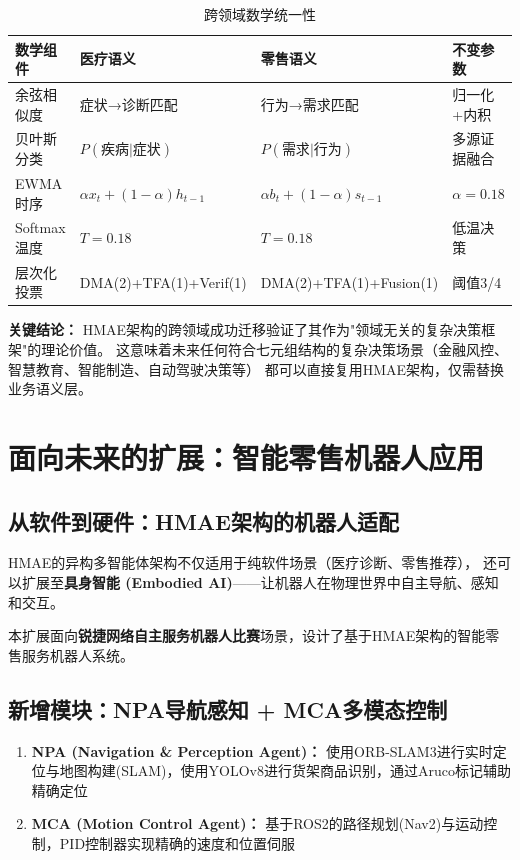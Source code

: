 \documentclass[11pt,a4paper]{ctexart}
\begin{document}
\begin{table}[H]
\centering
\small
\begin{tabular}{p{2.8cm}p{4.2cm}p{4.2cm}p{2.5cm}}
\toprule
\textbf{数学组件} & \textbf{医疗语义} & \textbf{零售语义} & \textbf{不变参数} \\
\midrule
余弦相似度 & 症状→诊断匹配 & 行为→需求匹配 & 归一化+内积 \\
贝叶斯分类 & $P(\text{疾病}|\text{症状})$ & $P(\text{需求}|\text{行为})$ & 多源证据融合 \\
EWMA时序 & $\alpha x_t + (1-\alpha)h_{t-1}$ & $\alpha b_t + (1-\alpha)s_{t-1}$ & $\alpha=0.18$ \\
Softmax温度 & $T=0.18$ & $T=0.18$ & 低温决策 \\
层次化投票 & DMA(2)+TFA(1)+Verif(1) & DMA(2)+TFA(1)+Fusion(1) & 阈值3/4 \\
\bottomrule
\end{tabular}
\caption{跨领域数学统一性}
\end{table}

\textbf{关键结论：} HMAE架构的跨领域成功迁移验证了其作为"领域无关的复杂决策框架"的理论价值。
这意味着未来任何符合七元组结构的复杂决策场景（金融风控、智慧教育、智能制造、自动驾驶决策等）
都可以直接复用HMAE架构，仅需替换业务语义层。

\newpage

\section{面向未来的扩展：智能零售机器人应用}

\subsection{从软件到硬件：HMAE架构的机器人适配}

HMAE的异构多智能体架构不仅适用于纯软件场景（医疗诊断、零售推荐），
还可以扩展至\textbf{具身智能 (Embodied AI)}——让机器人在物理世界中自主导航、感知和交互。

本扩展面向\textbf{锐捷网络自主服务机器人比赛}场景，设计了基于HMAE架构的智能零售服务机器人系统。

\subsection{新增模块：NPA导航感知 + MCA多模态控制}

\begin{enumerate}[nosep]
\item \textbf{NPA (Navigation \& Perception Agent)：} 使用ORB-SLAM3进行实时定位与地图构建(SLAM)，使用YOLOv8进行货架商品识别，通过Aruco标记辅助精确定位
\item \textbf{MCA (Motion Control Agent)：} 基于ROS2的路径规划(Nav2)与运动控制，PID控制器实现精确的速度和位置伺服
\end{enumerate}
\end{document}
